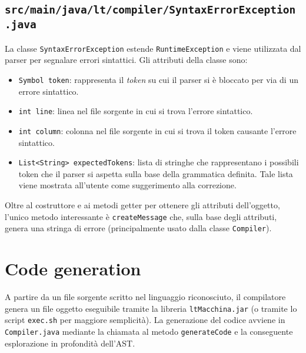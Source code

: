 \documentclass[hidelinks,10pt,a4paper]{article}
\begin{document}
\subsection{\texttt{src/main/java/lt/compiler/SyntaxErrorException.java}}
La classe \texttt{SyntaxErrorException} estende \texttt{RuntimeException} e viene utilizzata dal parser per segnalare errori sintattici.
Gli attributi della classe sono:
\begin{itemize}
    \item \texttt{Symbol token}: rappresenta il \textit{token} su cui il parser si è bloccato per via di un errore sintattico.
    \item \texttt{int line}: linea nel file sorgente in cui si trova l'errore sintattico.
    \item \texttt{int column}: colonna nel file sorgente in cui si trova il token causante l'errore sintattico.
    \item \texttt{List<String> expectedTokens}: lista di stringhe che rappresentano i possibili token che il parser si aspetta sulla base della grammatica definita. Tale lista viene mostrata all'utente come suggerimento alla correzione.
\end{itemize}
Oltre al costruttore e ai metodi getter per ottenere gli attributi dell'oggetto, l'unico metodo interessante è \texttt{createMessage} che, sulla base degli attributi, genera una stringa di errore (principalmente usato dalla classe \texttt{Compiler}).

\section{Code generation}

A partire da un file sorgente scritto nel linguaggio riconosciuto, il compilatore genera un file oggetto eseguibile tramite la libreria \texttt{ltMacchina.jar} (o tramite lo script \texttt{exec.sh} per maggiore semplicità).
La generazione del codice avviene in \texttt{Compiler.java} mediante la chiamata al metodo \texttt{generateCode} e la conseguente esplorazione in profondità dell'AST.
\end{document}
